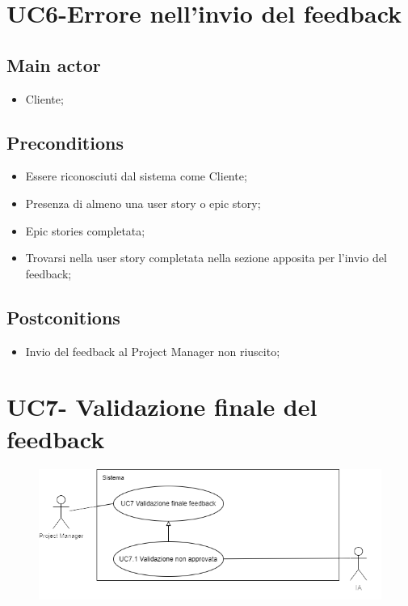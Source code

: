 \documentclass{article}
\begin{document}
\section{UC6-Errore nell'invio del feedback}

     \subsection*{Main actor}
     \begin{itemize}
         \item Cliente;
     \end{itemize}
     \subsection*{Preconditions} 
 \begin{itemize}
        \item Essere riconosciuti dal sistema come Cliente;
        \item Presenza di almeno una user story o epic story;
        \item Epic stories completata;
        \item Trovarsi nella user story completata nella sezione apposita per l'invio del feedback;
    \end{itemize}
     \subsection*{Postconitions} 
        \begin{itemize}
            \item Invio del feedback al Project Manager non riuscito;
        \end{itemize} 

        
\section{UC7- Validazione finale del feedback}

\begin{figure}[h]
      \centering
      \includegraphics{./imgUML/UC7.png}
      \label{fig:immagine}
    \end{figure}
    
\end{document}
